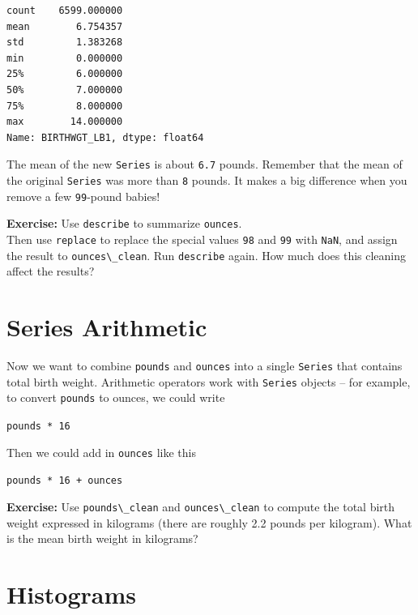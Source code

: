\begin{lstlisting}[style=output]
count    6599.000000
mean        6.754357
std         1.383268
min         0.000000
25%         6.000000
50%         7.000000
75%         8.000000
max        14.000000
Name: BIRTHWGT_LB1, dtype: float64
\end{lstlisting}

The mean of the new \passthrough{\lstinline!Series!} is about
\passthrough{\lstinline!6.7!} pounds. Remember that the mean of the
original \passthrough{\lstinline!Series!} was more than
\passthrough{\lstinline!8!} pounds. It makes a big difference when you
remove a few \passthrough{\lstinline!99!}-pound babies!

\textbf{Exercise:} Use \passthrough{\lstinline!describe!} to summarize
\passthrough{\lstinline!ounces!}.\\
Then use \passthrough{\lstinline!replace!} to replace the special values
\passthrough{\lstinline!98!} and \passthrough{\lstinline!99!} with
\passthrough{\lstinline!NaN!}, and assign the result to
\passthrough{\lstinline!ounces\_clean!}. Run
\passthrough{\lstinline!describe!} again. How much does this cleaning
affect the results?

\hypertarget{series-arithmetic}{%
\section{Series Arithmetic}\label{series-arithmetic}}

Now we want to combine \passthrough{\lstinline!pounds!} and
\passthrough{\lstinline!ounces!} into a single
\passthrough{\lstinline!Series!} that contains total birth weight.
Arithmetic operators work with \passthrough{\lstinline!Series!} objects
-- for example, to convert \passthrough{\lstinline!pounds!} to ounces,
we could write

\passthrough{\lstinline!pounds * 16!}

Then we could add in \passthrough{\lstinline!ounces!} like this

\passthrough{\lstinline!pounds * 16 + ounces!}

\textbf{Exercise:} Use \passthrough{\lstinline!pounds\_clean!} and
\passthrough{\lstinline!ounces\_clean!} to compute the total birth
weight expressed in kilograms (there are roughly 2.2 pounds per
kilogram). What is the mean birth weight in kilograms?

\hypertarget{histograms}{%
\section{Histograms}\label{histograms}}

